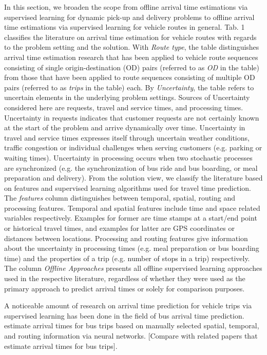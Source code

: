 In this section, we broaden the scope from offline arrival time estimations via supervised learning for dynamic pick-up and delivery problems to offline arrival time estimations via supervised learning for vehicle routes in general.
Tab. 1 classifies the literature on arrival time estimation for vehicle routes with regards to the problem setting and the solution.
With \textit{Route type}, the table distinguishes arrival time estimation research that has been applied to vehicle route sequences consisting of single origin-destination (OD) pairs (referred to as \textit{OD} in the table) from those that have been applied to route sequences consisting of multiple OD pairs (referred to as \textit{trips} in the table) each.
By \textit{Uncertainty}, the table refers to uncertain elements in the underlying problem settings. Sources of Uncertainty considered here are requests, travel and service times, and processing times. Uncertainty in requests indicates that customer requests are not certainly known at the start of the problem and arrive dynamically over time. Uncertainty in travel and service times expresses itself through uncertain weather conditions, traffic congestion or individual challenges when serving customers (e.g. parking or waiting times). Uncertainty in processing occurs when two stochastic processes are synchronized (e.g. the synchronization of bus ride and bus boarding, or meal preparation and delivery). From the solution view, we classify the literature based on features and supervised learning algorithms used for travel time prediction. The \textit{features} column distinguishes between temporal, spatial, routing and processing features.
Temporal and spatial features include time and space related variables respectively. Examples for former are time stamps at a start/end point or historical travel times, and examples for latter are GPS coordinates or distances between locations. Processing and routing features give information about the uncertainty in processing times (e.g. meal preparation or bus boarding time) and the properties of a trip (e.g. number of stops in a trip) respectively.
The column \textit{Offline Approaches} presents all offline supervised learning approaches used in the respective literature, regardless of whether they were used as the primary approach to predict arrival times or solely for comparison purposes. 

A noticeable amount of research on arrival time prediction for vehicle trips via supervised learning has been done in the field of bus arrival time prediction. \citet{Chen2004_ANNKalman} estimate arrival times for bus trips based on manually selected spatial, temporal, and routing information via neural networks. [Compare with related papers that estimate arrival times for bus trips].

